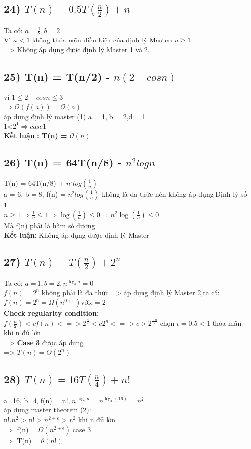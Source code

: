 \documentclass[10pt,a4paper]{article}
\begin{document}
\subsection*{24) $T(n) = 0.5T(\frac{n}{2}) + n$}
Ta có: $a = \frac{1}{2}, b = 2$\\
Vì $a < 1$ không thỏa mãn điều kiện của định lý Master: $a \geq 1$\\
=> Không áp dụng được định lý Master 1 và 2.
\subsection*{25) T(n) = T(n/2) - $n(2-cosn)$}
vì $1 \leq 2 - cosn \leq 3$\\
$\Rightarrow \mathcal{O}(f(n))=\mathcal{O}(n)$\\
áp dụng định lý master (1) 
a = 1, b = 2,d = 1\\
1<$2^1 \Rightarrow case 1$\\
\textbf{Kết luận :  T(n) = $\mathcal{O}(n)$}
\subsection*{26) T(n) = 64T(n/8) - $n^2logn$}
T(n) = 64T(n/8) + $n^2log(\frac{1}{n})$\\
a = 6, b = 8, f(n) = $n^2log(\frac{1}{n})$ không là đa thức nên không áp dụng Định lý số 1 \\
$ n \geq 1 \Rightarrow \frac{1}{n} \leq 1 \Rightarrow \log(\frac{1}{n}) \leq 0 \Rightarrow n^2\log(\frac{1}{n}) \leq 0$ \\
Mà f(n) phải là hàm số dương \\
\textbf{Kết luận: }Không áp dụng được định lý Master
\subsection*{27) $T(n) = T(\frac{n}{2}) + 2^n$}
Ta có: $a = 1, b = 2,n^{\log_b{a}} = 0$ \\
$f(n) = 2^n$ không phải là đa thức => áp dụng định lý Master 2,ta có: \\
$f(n) = 2^n = \Omega(n^{0+\epsilon}) \text{với} \epsilon = 2 $ \\
\textbf{Check regularity condition:}\\
$f(\frac{n}{2}) < cf(n) <=> 2^{\frac{n}{2}} < c2^n <=> c > 2^{\frac{-n}{2}}$ chọn $c = 0.5 < 1$ thỏa mãn khi n đủ lớn \\
=> \textbf{Case 3} được áp dụng \\
=> $T(n) = \Theta(2^n)$
\subsection*{28) $T(n) = 16T(\frac{n}{4}) + n!$}
a=16, b=4, f(n) = n!, $n^{\log_ba} = n^{\log_4(16)} = n^2$\\
áp dụng master theorem (2):\\
n!.$n^2$ > n! > $n^{2+\epsilon}$ > $n^2$ khi n đủ lớn\\
$\Rightarrow$ f(n) = $\Omega(n^{2+\epsilon})$ case 3\\
$\Rightarrow $ T(n) = $\theta(n!)$ 
\end{document}
